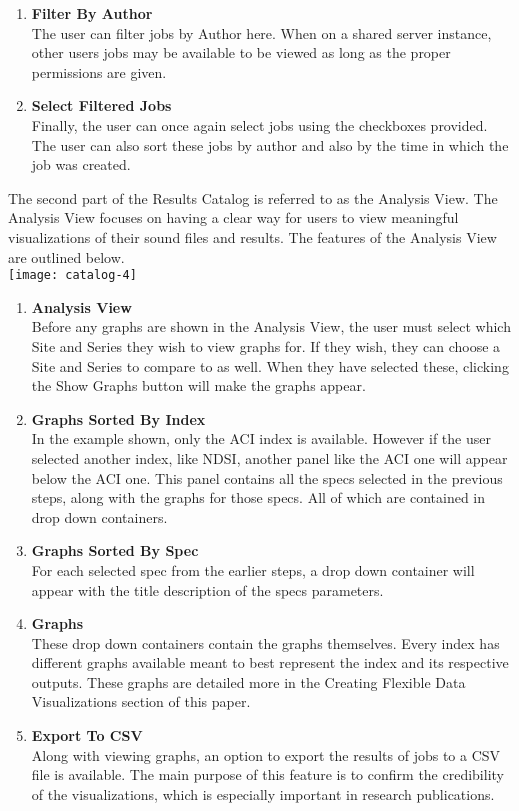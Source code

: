 \begin{enumerate}
    \item \textbf{Filter By Author}\\ The user can filter jobs by Author here. When on a shared server instance, other user\textquotesingle s jobs may be available to be viewed as long as the proper permissions are given.
    \item \textbf{Select Filtered Jobs}\\ Finally, the user can once again select jobs using the checkboxes provided. The user can also sort these jobs by author and also by the time in which the job was created.
\end{enumerate}
The second part of the Results Catalog is referred to as the Analysis View. The Analysis View focuses on having a clear way for users to view meaningful visualizations of their sound files and results. The features of the Analysis View are outlined below.\\
\texttt{[image: catalog-4]}
\begin{enumerate}
  \item \textbf{Analysis View}\\ Before any graphs are shown in the Analysis View, the user must select which Site and Series they wish to view graphs for. If they wish, they can choose a Site and Series to compare to as well. When they have selected these, clicking the Show Graphs button will make the graphs appear.
  \item \textbf{Graphs Sorted By Index}\\ In the example shown, only the ACI index is available. However if the user selected another index, like NDSI, another panel like the ACI one will appear below the ACI one. This panel contains all the specs selected in the previous steps, along with the graphs for those specs. All of which are contained in drop down containers.
  \item \textbf{Graphs Sorted By Spec}\\ For each selected spec from the earlier steps, a drop down container will appear with the title description of the spec\textquotesingle s parameters.
  \item \textbf{Graphs}\\ These drop down containers contain the graphs themselves. Every index has different graphs available meant to best represent the index and its respective outputs. These graphs are detailed more in the Creating Flexible Data Visualizations section of this paper.
  \item \textbf{Export To CSV}\\ Along with viewing graphs, an option to export the results of jobs to a CSV file is available. The main purpose of this feature is to confirm the credibility of the visualizations, which is especially important in research publications.
\end{enumerate}
